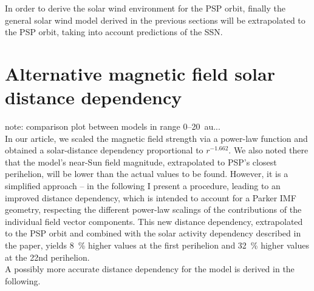 In order to derive the solar wind environment for the PSP orbit, finally the general solar wind model derived in the previous sections will be extrapolated to the PSP orbit, taking into account predictions of the SSN.\\


\section{Alternative magnetic field solar distance dependency}

note: comparison plot between models in range 0--20~au...\\

In our article, we scaled the magnetic field strength via a power-law function and obtained a solar-distance dependency proportional to $r^{-1.662}$. We also noted there that the model's near-Sun field magnitude, extrapolated to PSP's closest perihelion, will be lower than the actual values to be found. However, it is a simplified approach -- in the following I present a procedure, leading to an improved distance dependency, which is intended to account for a Parker IMF geometry,  respecting the different power-law scalings of the contributions of the individual field vector components. This new distance dependency, extrapolated to the PSP orbit and combined with the solar activity dependency described in the paper, yields \SI{8}{\%} higher values at the first perihelion and \SI{32}{\%} higher values at the 22nd perihelion.\\

A possibly more accurate distance dependency for the model is derived in the following.\\


